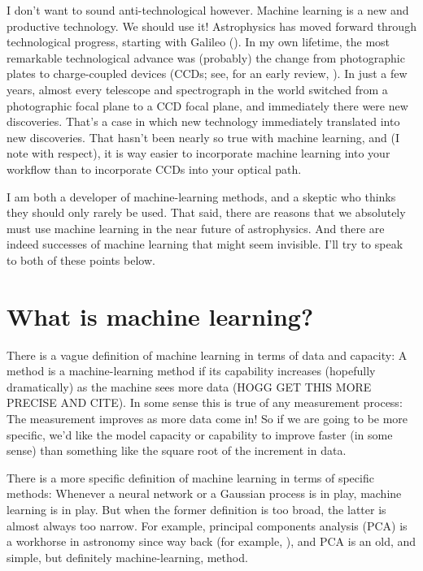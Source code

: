 \documentclass[11pt]{article}
\begin{document}
I don't want to sound anti-technological however.
Machine learning is a new and productive technology.
We should use it!
Astrophysics has moved forward through technological progress, starting with Galileo (\cite{galileo}).
In my own lifetime, the most remarkable technological advance was (probably) the change from photographic plates to charge-coupled devices (CCDs; see, for an early review, \cite{ccd}).
In just a few years, almost every telescope and spectrograph in the world switched from a photographic focal plane to a CCD focal plane, and immediately there were new discoveries.
That's a case in which new technology immediately translated into new discoveries.
That hasn't been nearly so true with machine learning, and (I note with respect), it is way easier to incorporate machine learning into your workflow than to incorporate CCDs into your optical path.

I am both a developer of machine-learning methods, and a skeptic who thinks they should only rarely be used.
That said, there are reasons that we absolutely must use machine learning in the near future of astrophysics.
And there are indeed successes of machine learning that might seem invisible.
I'll try to speak to both of these points below.

\section{What is machine learning?}\label{sec:what}

There is a vague definition of machine learning in terms of data and capacity:
A method is a machine-learning method if its capability increases (hopefully dramatically) as the machine sees more data (HOGG GET THIS MORE PRECISE AND CITE).
In some sense this is true of any measurement process:
The measurement improves as more data come in!
So if we are going to be more specific, we'd like the model capacity or capability to improve faster (in some sense) than something like the square root of the increment in data.

There is a more specific definition of machine learning in terms of specific methods:
Whenever a neural network or a Gaussian process is in play, machine learning is in play.
But when the former definition is too broad, the latter is almost always too narrow.
For example, principal components analysis (PCA) is a workhorse in astronomy since way back (for example, \cite{pcaredshift}), and PCA is an old, and simple, but definitely machine-learning, method.
\end{document}
